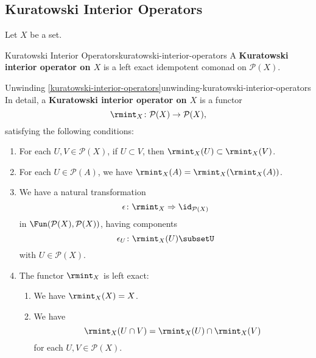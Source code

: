 \subsection{Kuratowski Interior Operators}\label{subsection-kuratowski-interior-operators}
Let $X$ be a set.
\begin{definition}{Kuratowski Interior Operators}{kuratowski-interior-operators}%
    A \textbf{Kuratowski interior operator on $X$} is a left exact idempotent comonad on $\mathcal{P}(X)$.
\end{definition}
\begin{remark}{Unwinding \cref{kuratowski-interior-operators}}{unwinding-kuratowski-interior-operators}%
    In detail, a \textbf{Kuratowski interior operator on $X$} is a functor
    \[
        \rmint_{X}%
        \colon%
        \mathcal{P}(X)%
        \to%
        \mathcal{P}(X),%
    \]%
    satisfying the following conditions:
    \begin{enumerate}
        \item\label{unwinding-kuratowski-interior-operators-functoriality}For each $U,V\in\mathcal{P}(X)$, if $U\subset V$, then $\rmint_{X}(U)\subset\rmint_{X}(V)$.
        \item\label{unwinding-kuratowski-interior-operators-idempotency}For each $U\in\mathcal{P}(A)$, we have $\rmint_{X}(A)=\rmint_{X}(\rmint_{X}(A))$.
        \item\label{unwinding-kuratowski-interior-operators-counitality}We have a natural transformation
            \[
                \epsilon%
                \colon%
                \rmint_{X}%
                \Rightarrow%
                \id_{\mathcal{P}(X)}%
            \]%
            in $\Fun(\mathcal{P}(X),\mathcal{P}(X))$, having components
            \[
                \epsilon_{U}%
                \colon%
                \rmint_{X}(U)%
                \subset%
                U%
            \]%
            with $U\in\mathcal{P}(X)$.
        \item\label{unwinding-kuratowski-interior-operators-left-exactness}The functor $\rmint_{X}$ is left exact:
            \begin{enumerate}
                \item\label{unwinding-kuratowski-interior-operators-left-exactness-preservation-of-the-total-set}We have $\rmint_{X}(X)=X$.
                \item\label{unwinding-kuratowski-interior-operators-left-exactness-preservation-of-finite-intersections}We have
                    \[
                        \rmint_{X}(U\cap V)%
                        =%
                        \rmint_{X}(U)\cap\rmint_{X}(V)%
                    \]%
                    for each $U,V\in\mathcal{P}(X)$.
            \end{enumerate}
    \end{enumerate}
\end{remark}
\begin{appendices}

\end{appendices}

